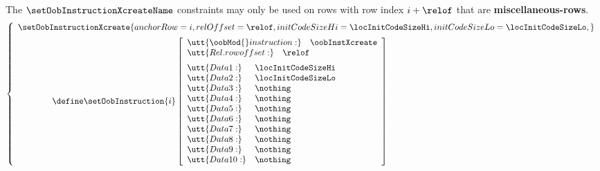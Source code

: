 \saNote{}
The $\setOobInstructionXcreateName$ constraints may only be used on rows with row index $i + \relof$ that are \textbf{miscellaneous-rows}.
\[
        \left\{ \begin{array}{l}
                \setOobInstructionXcreate {
                        anchorRow      = i                  ,
                        relOffset      = \relof             ,
                        initCodeSizeHi = \locInitCodeSizeHi ,
                        initCodeSizeLo = \locInitCodeSizeLo ,
                }
                \vspace{2mm} \\
                \qquad \qquad \define
                \setOobInstruction{i}
                \left[ \begin{array}{llr}
                        \multicolumn{3}{l}{\utt{\oobMod{} instruction:} \quad \oobInstXcreate}             \\
                        \multicolumn{3}{l}{\utt{Rel. row offset:}       \quad \relof}         \vspace{2mm} \\
                        \utt{Data 1:}  & \locInitCodeSizeHi \\
                        \utt{Data 2:}  & \locInitCodeSizeLo \\
                        \utt{Data 3:}  & \nothing           \\
                        \utt{Data 4:}  & \nothing           \\
                        \utt{Data 5:}  & \nothing           \\
                        \utt{Data 6:}  & \nothing           \\
                        \utt{Data 7:}  & \nothing           \\
                        \utt{Data 8:}  & \nothing           \\
                        \utt{Data 9:}  & \nothing           \\
                        \utt{Data 10:} & \nothing           \\
                \end{array} \right] \\
        \end{array} \right.
\]
